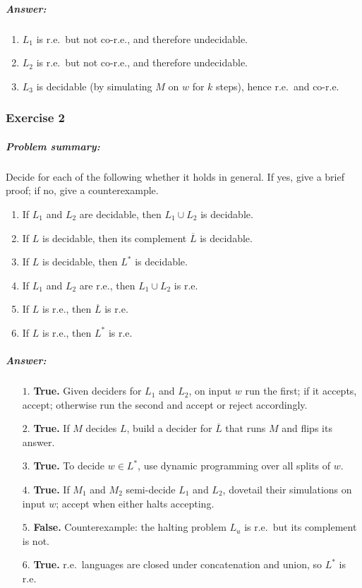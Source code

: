 \documentclass{article}
\begin{document}
\subparagraph*{Answer:}
\begin{enumerate}
  \item \(L_1\) is r.e.\ but not co-r.e., and therefore undecidable.
  \item \(L_2\) is r.e.\ but not co-r.e., and therefore undecidable.
  \item \(L_3\) is decidable (by simulating \(M\) on \(w\) for \(k\) steps), hence r.e.\ and co-r.e.
\end{enumerate}

\subsubsection*{Exercise 2}
\subparagraph*{Problem summary:}  
Decide for each of the following whether it holds in general.  If yes, give a brief proof; if no, give a counterexample.
\begin{enumerate}
  \item If \(L_1\) and \(L_2\) are decidable, then \(L_1\cup L_2\) is decidable.
  \item If \(L\) is decidable, then its complement \(\overline L\) is decidable.
  \item If \(L\) is decidable, then \(L^*\) is decidable.
  \item If \(L_1\) and \(L_2\) are r.e., then \(L_1\cup L_2\) is r.e.
  \item If \(L\) is r.e., then \(\overline L\) is r.e.
  \item If \(L\) is r.e., then \(L^*\) is r.e.
\end{enumerate}

\subparagraph*{Answer:}
\begin{enumerate}
  \item[\(1.\)] \textbf{True.} Given deciders for \(L_1\) and \(L_2\), on input \(w\) run the first; if it accepts, accept; otherwise run the second and accept or reject accordingly.
  \item[\(2.\)] \textbf{True.} If \(M\) decides \(L\), build a decider for \(\overline L\) that runs \(M\) and flips its answer.
  \item[\(3.\)] \textbf{True.} To decide \(w\in L^*\), use dynamic programming over all splits of \(w\).
  \item[\(4.\)] \textbf{True.} If \(M_1\) and \(M_2\) semi-decide \(L_1\) and \(L_2\), dovetail their simulations on input \(w\); accept when either halts accepting.
  \item[\(5.\)] \textbf{False.} Counterexample: the halting problem \(L_u\) is r.e.\ but its complement is not.
  \item[\(6.\)] \textbf{True.} r.e.\ languages are closed under concatenation and union, so \(L^*\) is r.e.
\end{enumerate}
\end{document}
